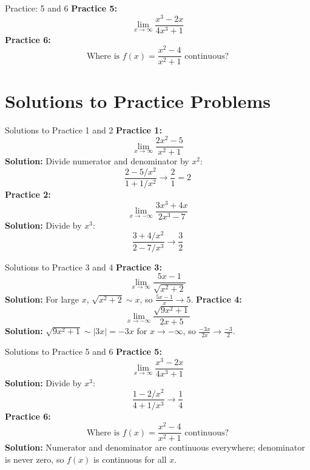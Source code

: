 \documentclass[aspectratio=169]{beamer}
\begin{document}
\begin{frame}{Practice: 5 and 6}
\textbf{Practice 5:}
\[
\lim_{x \to \infty} \frac{x^3-2x}{4x^3+1}
\]
\vspace{1em}
\textbf{Practice 6:}
\[
\text{Where is } f(x) = \frac{x^2-4}{x^2+1} \text{ continuous?}
\]
\end{frame}

\section{Solutions to Practice Problems}

\begin{frame}{Solutions to Practice 1 and 2}
\textbf{Practice 1:}
\[
\lim_{x \to \infty} \frac{2x^2-5}{x^2+1}
\]
\textbf{Solution:}
Divide numerator and denominator by $x^2$:
\[
\frac{2-5/x^2}{1+1/x^2} \to \frac{2}{1} = 2
\]
\vspace{1em}
\textbf{Practice 2:}
\[
\lim_{x \to -\infty} \frac{3x^3+4x}{2x^3-7}
\]
\textbf{Solution:}
Divide by $x^3$:
\[
\frac{3+4/x^2}{2-7/x^3} \to \frac{3}{2}
\]
\end{frame}

\begin{frame}{Solutions to Practice 3 and 4}
\textbf{Practice 3:}
\[
\lim_{x \to \infty} \frac{5x-1}{\sqrt{x^2+2}}
\]
\textbf{Solution:}
For large $x$, $\sqrt{x^2+2} \sim x$, so $\frac{5x-1}{x} \to 5$.
\vspace{1em}
\textbf{Practice 4:}
\[
\lim_{x \to -\infty} \frac{\sqrt{9x^2+1}}{2x+5}
\]
\textbf{Solution:}
$\sqrt{9x^2+1} \sim |3x| = -3x$ for $x \to -\infty$, so $\frac{-3x}{2x} \to \frac{-3}{2}$.
\end{frame}

\begin{frame}{Solutions to Practice 5 and 6}
\textbf{Practice 5:}
\[
\lim_{x \to \infty} \frac{x^3-2x}{4x^3+1}
\]
\textbf{Solution:}
Divide by $x^3$:
\[
\frac{1-2/x^2}{4+1/x^3} \to \frac{1}{4}
\]
\vspace{1em}
\textbf{Practice 6:}
\[
\text{Where is } f(x) = \frac{x^2-4}{x^2+1} \text{ continuous?}
\]
\textbf{Solution:}
Numerator and denominator are continuous everywhere; denominator is never zero, so $f(x)$ is continuous for all $x$.
\end{frame}
\end{document}
